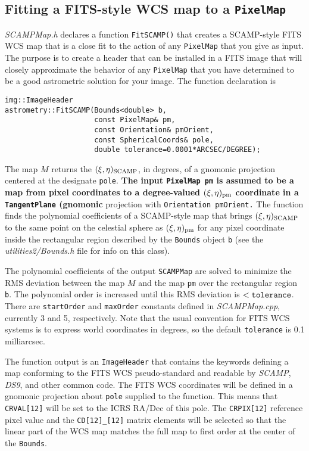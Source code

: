 \documentclass[11pt,preprint,flushrt]{aastex}
\begin{document}
\subsection{Fitting a FITS-style WCS map to a {\tt PixelMap}}
{\it SCAMPMap.h} declares a function {\tt FitSCAMP()} that creates a SCAMP-style FITS WCS map that is a close fit to the action of any {\tt PixelMap} that you give as input.  The purpose is to create a header that can be installed in a FITS image that will closely approximate the behavior of any {\tt PixelMap} that you have determined to be a good astrometric solution for your image.  The function declaration is
\begin{verbatim}
img::ImageHeader 
astrometry::FitSCAMP(Bounds<double> b,
                     const PixelMap& pm,
                     const Orientation& pmOrient,
                     const SphericalCoords& pole,
                     double tolerance=0.0001*ARCSEC/DEGREE);
\end{verbatim}
The map $M$ returns the $(\xi,\eta)_{\rm SCAMP}$, in degrees, of a gnomonic projection centered at the designate {\tt pole}.  {\bf The input {\tt PixelMap pm} is assumed to be a map from pixel coordinates to a degree-valued $(\xi,\eta)_{\rm pm}$ coordinate in a {\tt TangentPlane} (gnomonic} projection with {\tt Orientation pmOrient.}  The function finds the polynomial coefficients of a SCAMP-style map that brings $(\xi,\eta)_{\rm SCAMP}$ to the same point on the celestial sphere as $(\xi,\eta)_{\rm pm}$ for any pixel coordinate inside the rectangular region described by the {\tt Bounds} object {\tt b} (see the {\it utilities2/Bounds.h} file for info on this class).  

The polynomial coefficients of the output {\tt SCAMPMap} are solved to minimize the RMS deviation between the map $M$ and the map {\tt pm} over the rectangular region {\tt b}.   The polynomial order is increased until this RMS deviation is $<{\tt tolerance}$.  There are {\tt startOrder} and {\tt maxOrder} constants defined in {\it SCAMPMap.cpp}, currently 3 and 5, respectively.  Note that the usual convention for FITS WCS systems is to express world coordinates in degrees, so the default {\tt tolerance} is 0.1 milliarcsec.  

The function output is an {\tt ImageHeader} that contains the keywords defining a map conforming to the FITS WCS pseudo-standard and readable by {\it SCAMP}, {\it DS9}, and other common code.  
The FITS WCS coordinates will be defined in a gnomonic projection about {\tt pole} supplied to the function.  This means that {\tt CRVAL[12]} will be set to the ICRS RA/Dec of this pole.  The {\tt CRPIX[12]} reference pixel value and the {\tt CD[12]\_[12]} matrix elements will be selected so that the linear part of the WCS map matches the full map to first order at the center of the {\tt Bounds}.
\end{document}
